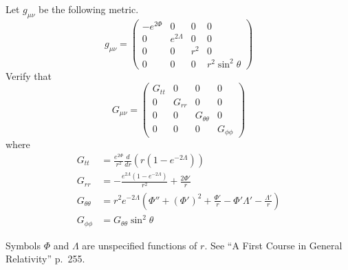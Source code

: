 \documentclass[12pt]{article}
\begin{document}
\noindent
Let $g_{\mu\nu}$ be the following metric.
$$
g_{\mu\nu}=
\begin{pmatrix}
-e^{2\Phi} & 0 & 0 & 0\\
0 & e^{2\Lambda} & 0 & 0\\
0 & 0 & r^2 & 0\\
0 & 0 & 0 & r^2\sin^2\theta
\end{pmatrix}
$$
Verify that
$$
G_{\mu\nu}=\begin{pmatrix}
G_{tt} & 0 & 0 & 0\\
0 & G_{rr} & 0 & 0\\
0 & 0 & G_{\theta\theta} & 0\\
0 & 0 & 0 & G_{\phi\phi}
\end{pmatrix}
$$
where
\begin{align*}
G_{tt}&=\frac{e^{2\Phi}}{r^2}\frac{d}{dr}\left(r(1-e^{-2\Lambda})\right)
\\[2ex]
G_{rr}&=-\frac{e^{2\Lambda}(1-e^{-2\Lambda})}{r^2}+\frac{2\Phi'}{r}
\\[2ex]
G_{\theta\theta}&=r^2e^{-2\Lambda}\left(\Phi''+(\Phi')^2+\frac{\Phi'}{r}-\Phi'\Lambda'-\frac{\Lambda'}{r}\right)
\\[2ex]
G_{\phi\phi}&=G_{\theta\theta}\sin^2\theta
\end{align*}

\noindent
Symbols $\Phi$ and $\Lambda$ are unspecified functions of $r$.
See ``A First Course in General Relativity'' p.~255.
\end{document}
